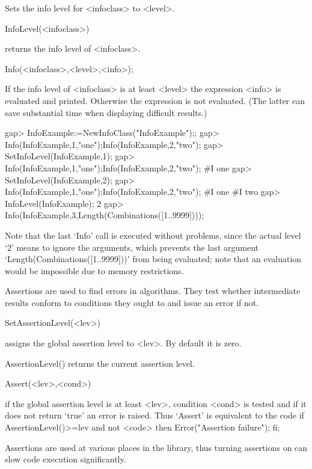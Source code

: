 Sets the info level for <infoclass> to <level>.

\>InfoLevel(<infoclass>)

returns the info level of <infoclass>.

\>Info(<infoclass>,<level>,<info>);

If the info level of <infoclass> is at least <level> the expression <info>
is evaluated and printed. Otherwise the expression is not evaluated. (The
latter can save substantial time when displaying difficult results.)

\beginexample
gap> InfoExample:=NewInfoClass("InfoExample");;
gap> Info(InfoExample,1,"one");Info(InfoExample,2,"two");
gap> SetInfoLevel(InfoExample,1);
gap> Info(InfoExample,1,"one");Info(InfoExample,2,"two");
#I  one
gap> SetInfoLevel(InfoExample,2);
gap> Info(InfoExample,1,"one");Info(InfoExample,2,"two");
#I  one
#I  two
gap> InfoLevel(InfoExample);
2
gap> Info(InfoExample,3,Length(Combinations([1..9999])));
\endexample

Note that the last `Info' call is executed without problems,
since the actual level `2' means to ignore the arguments,
which prevents the last argument `Length(Combinations([1..9999]))'
from being evaluated;
note that an evaluation would be impossible due to memory restrictions.


Assertions are used to find errors in algorithms. They test whether
intermediate results conform to conditions they ought to and issue an error
if not.

\>SetAssertionLevel(<lev>)

assigns the global assertion level to <lev>. By default it is zero.

\>AssertionLevel()
returns the current assertion level.

\>Assert(<lev>,<cond>)

if the global assertion level is at least <lev>, condition <cond> is tested
and if it does not return `true' an error is raised. Thus `Assert' is
equivalent to the code
\begintt
if AssertionLevel()>=lev and not <code> then
  Error("Assertion failure");
fi;
\endtt

Assertions are used at various places in the library, thus turning
assertions on can slow code execution significantly.

